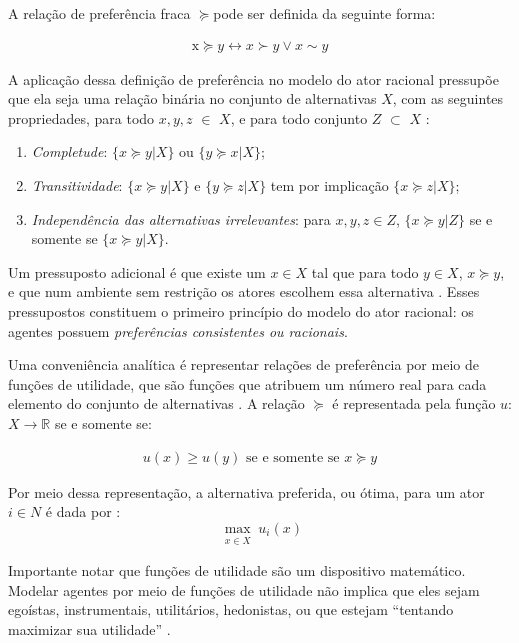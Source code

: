 A relação de preferência fraca \( \succeq \)pode ser definida da seguinte forma:

\begin{align*}
  \text{x} \succeq y \leftrightarrow x \succ y \lor x \sim y
\end{align*}

A aplicação dessa definição de preferência no modelo do ator racional pressupõe
que ela seja uma relação binária no conjunto de alternativas \(X\), com as
seguintes propriedades, para todo \(x,y,z\) $\in$ \(X\), e para todo conjunto
\(Z\) $\subset$ \(X\) \cite{gintis2016individuality,
  binmore2008rational}:



\begin{enumerate}
\item \textit{Completude}: \(\{ x \succeq y | X \}\) ou \(\{ y \succeq x | X \}\);
\item \textit{Transitividade}: \( \{x \succeq y | X\} \) e \(\{y \succeq z | X \}\) tem por
  implicação \(\{x \succeq z | X\}\);
 \item \textit{Independência das alternativas irrelevantes}: para \(x,y,z \in Z\),
   \(\{x \succeq y | Z \}\) se e somente se \(\{x \succeq y | X\}\).
\end{enumerate}

Um pressuposto adicional é que existe um \(x \in X\) tal que para todo \(y \in X\),
\(x \succeq y\), e que num ambiente sem restrição os atores escolhem essa alternativa
\cite{gintis2009bounds}. Esses pressupostos constituem o primeiro princípio do
modelo do ator racional: os agentes possuem \textit{preferências consistentes ou
racionais}.

Uma conveniência analítica é representar relações de preferência por meio de
funções de utilidade, que são funções que atribuem um número real para cada
elemento do conjunto de alternativas \cite{sep-preferences}. A relação \( \succeq\) é
representada pela função \(u\): \(X \longrightarrow \mathbb{R}\) se e somente se:

\begin{align*}
  u(x) \geq u(y)
  \text{ se e somente se }
  x \succeq y
\end{align*}

Por meio dessa representação, a alternativa preferida, ou ótima, para um ator $i
\in N$ é dada por \cite{binmore2008rational}:
\[\max_{\substack{x \in  X}}
  u_i(x)
\]

Importante notar que funções de utilidade são um dispositivo matemático. Modelar
agentes por meio de funções de utilidade 
não implica que eles sejam  egoístas, instrumentais, utilitários,
hedonistas, ou que estejam ``tentando maximizar sua utilidade''
\cite{gaus2007philosophy}.

